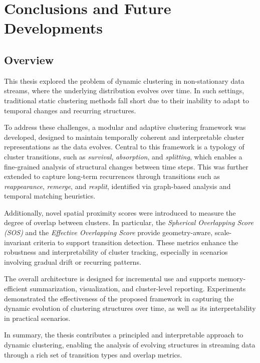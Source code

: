 \chapter{Conclusions and Future Developments}\label{ch:conclusions}

\section{Overview}\label{sec:overview}

This thesis explored the problem of dynamic clustering in non-stationary data
streams, where the underlying distribution evolves over time. In such settings,
traditional static clustering methods fall short due to their inability to
adapt to temporal changes and recurring structures.

To address these challenges, a modular and adaptive clustering framework was
developed, designed to maintain temporally coherent and interpretable cluster
representations as the data evolves. Central to this framework is a typology of
cluster transitions, such as \emph{survival}, \emph{absorption}, and
\emph{splitting}, which enables a fine-grained analysis of structural changes
between time steps. This was further extended to capture long-term recurrences
through transitions such as \emph{reappearance}, \emph{remerge}, and
\emph{resplit}, identified via graph-based analysis and temporal matching
heuristics.

Additionally, novel spatial proximity scores were introduced to measure the
degree of overlap between clusters. In particular, the \emph{Spherical
    Overlapping Score (SOS)} and the \emph{Effective Overlapping Score} provide
geometry-aware, scale-invariant criteria to support transition detection. These
metrics enhance the robustness and interpretability of cluster tracking,
especially in scenarios involving gradual drift or recurring patterns.

The overall architecture is designed for incremental use and supports
memory-efficient summarization, visualization, and cluster-level reporting.
Experiments demonstrated the effectiveness of the proposed framework in
capturing the dynamic evolution of clustering structures over time, as well as
its interpretability in practical scenarios.

In summary, the thesis contributes a principled and interpretable approach to
dynamic clustering, enabling the analysis of evolving structures in streaming
data through a rich set of transition types and overlap metrics.

